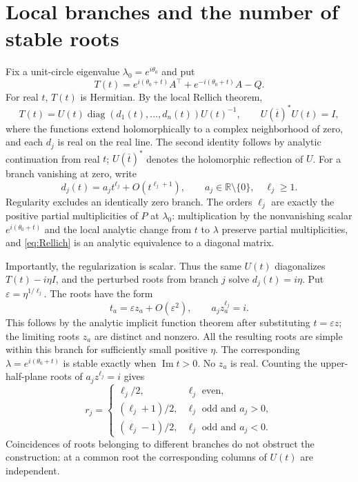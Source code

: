 \documentclass[11pt]{article}
\newcommand{\R}{\mathbb R}
\newcommand{\Ima}{\operatorname{Im}}
\newcommand{\diag}{\operatorname{diag}}
\begin{document}
\section{Local branches and the number of stable roots}
Fix a unit-circle eigenvalue $\lambda_0=e^{i\theta_0}$ and put
\[
T(t)=e^{i(\theta_0+t)}A^\top+e^{-i(\theta_0+t)}A-Q.
\]
For real $t$, $T(t)$ is Hermitian. By the local Rellich theorem,
\begin{equation}\label{eq:Rellich}
T(t)=U(t)\diag(d_1(t),\ldots,d_n(t))U(t)^{-1},
\qquad U(\overline t)^*U(t)=I,
\end{equation}
where the functions extend holomorphically to a complex neighborhood of zero, and each
$d_j$ is real on the real line. The second identity follows by analytic continuation
from real $t$; $U(\overline t)^*$ denotes the holomorphic reflection of $U$.
For a branch vanishing at zero, write
\begin{equation}\label{eq:branch}
d_j(t)=a_jt^{\ell_j}+O(t^{\ell_j+1}),\qquad a_j\in\R\setminus\{0\},\quad \ell_j\ge1.
\end{equation}
Regularity excludes an identically zero branch. The orders $\ell_j$ are exactly the
positive partial multiplicities of $P$ at $\lambda_0$: multiplication by the nonvanishing
scalar $e^{i(\theta_0+t)}$ and the local analytic change from $t$ to $\lambda$ preserve
partial multiplicities, and \eqref{eq:Rellich} is an analytic equivalence to a diagonal matrix.

Importantly, the regularization is scalar. Thus the same $U(t)$ diagonalizes
$T(t)-i\eta I$, and the perturbed roots from branch $j$ solve $d_j(t)=i\eta$.
Put $\varepsilon=\eta^{1/\ell_j}$. The roots have the form
\begin{equation}\label{eq:rootexp}
t_a=\varepsilon z_a+O(\varepsilon^2),\qquad a_jz_a^{\ell_j}=i.
\end{equation}
This follows by the analytic implicit function theorem after substituting $t=\varepsilon z$;
the limiting roots $z_a$ are distinct and nonzero. All the resulting roots are simple
within this branch for sufficiently small positive $\eta$.
The corresponding $\lambda=e^{i(\theta_0+t)}$ is stable exactly when $\Ima t>0$.
No $z_a$ is real. Counting the upper-half-plane roots of $a_jz^{\ell_j}=i$ gives
\begin{equation}\label{eq:r}
r_j=\begin{cases}
\ell_j/2,&\ell_j\text{ even},\\
(\ell_j+1)/2,&\ell_j\text{ odd and }a_j>0,\\
(\ell_j-1)/2,&\ell_j\text{ odd and }a_j<0.
\end{cases}
\end{equation}
Coincidences of roots belonging to different branches do not obstruct the construction:
at a common root the corresponding columns of $U(t)$ are independent.
\end{document}
